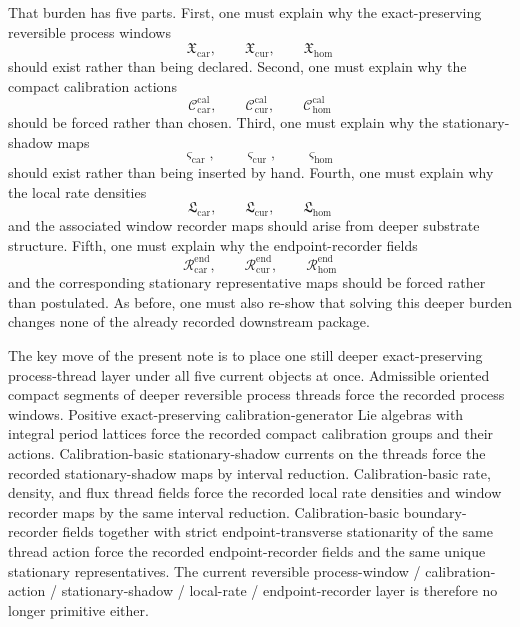 \documentclass[11pt]{article}
\newcommand{\TensorWindowClass}{\mathfrak X_{\mathrm{car}}}
\newcommand{\CurWindowClass}{\mathfrak X_{\mathrm{cur}}}
\newcommand{\HomWindowClass}{\mathfrak X_{\mathrm{hom}}}
\newcommand{\TensorCalGroup}{\mathcal C_{\mathrm{car}}^{\mathrm{cal}}}
\newcommand{\CurCalGroup}{\mathcal C_{\mathrm{cur}}^{\mathrm{cal}}}
\newcommand{\HomCalGroup}{\mathcal C_{\mathrm{hom}}^{\mathrm{cal}}}
\newcommand{\TensorStatTag}{\varsigma_{\mathrm{car}}}
\newcommand{\CurStatTag}{\varsigma_{\mathrm{cur}}}
\newcommand{\HomStatTag}{\varsigma_{\mathrm{hom}}}
\newcommand{\TensorLocalRate}{\mathfrak L_{\mathrm{car}}}
\newcommand{\CurLocalRate}{\mathfrak L_{\mathrm{cur}}}
\newcommand{\HomLocalRate}{\mathfrak L_{\mathrm{hom}}}
\newcommand{\TensorEndpointReadSeed}{\mathscr R_{\mathrm{car}}^{\mathrm{end}}}
\newcommand{\CurEndpointReadSeed}{\mathscr R_{\mathrm{cur}}^{\mathrm{end}}}
\newcommand{\HomEndpointReadSeed}{\mathscr R_{\mathrm{hom}}^{\mathrm{end}}}
\begin{document}
That burden has five parts. First, one must explain why the exact-preserving reversible process windows
\[
\TensorWindowClass,\qquad
\CurWindowClass,\qquad
\HomWindowClass
\]
should exist rather than being declared. Second, one must explain why the compact calibration actions
\[
\TensorCalGroup,\qquad
\CurCalGroup,\qquad
\HomCalGroup
\]
should be forced rather than chosen. Third, one must explain why the stationary-shadow maps
\[
\TensorStatTag,\qquad
\CurStatTag,\qquad
\HomStatTag
\]
should exist rather than being inserted by hand. Fourth, one must explain why the local rate densities
\[
\TensorLocalRate,\qquad
\CurLocalRate,\qquad
\HomLocalRate
\]
and the associated window recorder maps should arise from deeper substrate structure. Fifth, one must explain why the endpoint-recorder fields
\[
\TensorEndpointReadSeed,\qquad
\CurEndpointReadSeed,\qquad
\HomEndpointReadSeed
\]
and the corresponding stationary representative maps should be forced rather than postulated. As before, one must also re-show that solving this deeper burden changes none of the already recorded downstream package.

The key move of the present note is to place one still deeper exact-preserving process-thread layer under all five current objects at once. Admissible oriented compact segments of deeper reversible process threads force the recorded process windows. Positive exact-preserving calibration-generator Lie algebras with integral period lattices force the recorded compact calibration groups and their actions. Calibration-basic stationary-shadow currents on the threads force the recorded stationary-shadow maps by interval reduction. Calibration-basic rate, density, and flux thread fields force the recorded local rate densities and window recorder maps by the same interval reduction. Calibration-basic boundary-recorder fields together with strict endpoint-transverse stationarity of the same thread action force the recorded endpoint-recorder fields and the same unique stationary representatives. The current reversible process-window / calibration-action / stationary-shadow / local-rate / endpoint-recorder layer is therefore no longer primitive either.
\end{document}
